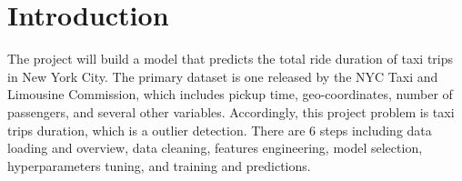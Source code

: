 \section{Introduction}\label{sec-intro}
The project will build a model that predicts the total ride duration of taxi trips
in New York City. The primary dataset is one released by the NYC Taxi and
Limousine Commission, which includes pickup time, geo-coordinates, number of
passengers, and several other variables. Accordingly, this project problem is taxi
trips duration, which is a outlier detection. There are 6 steps including data loading
and overview, data cleaning, features engineering, model selection, hyperparameters
tuning, and training and predictions.











